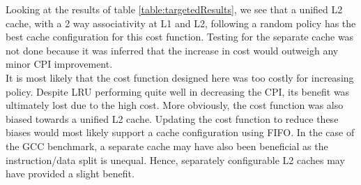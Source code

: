 \documentclass[twocolumn]{article}
\begin{document}
Looking at the results of table \ref{table:targetedResults}, we see that a unified L2 cache, with a 2 way associativity at L1 and L2, following a random policy has the best cache configuration for this cost function. Testing for the separate cache was not done because it was inferred that the increase in cost would outweigh any minor CPI improvement.\\ 

It is most likely that the cost function designed here was too costly for increasing policy. Despite LRU performing quite well in decreasing the CPI, its benefit was ultimately lost due to the high cost. More obviously, the cost function was also biased towards a unified L2 cache. Updating the cost function to reduce these biases would most likely support a cache configuration using FIFO. In the case of the GCC benchmark, a separate cache may have also been beneficial as the instruction/data split is unequal. Hence, separately configurable L2 caches may have provided a slight benefit.  




\printbibliography
\end{document}
